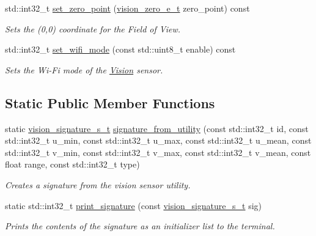 \begin{DoxyCompactItemize}
std\+::int32\+\_\+t \mbox{\hyperlink{classpros_1_1Vision_a89e0a23b112b8632171ef27cc6f57a6c}{set\+\_\+zero\+\_\+point}} (\mbox{\hyperlink{vision_8h_a2e8bc1c48f8aab12275bfc1868fbbad6}{vision\+\_\+zero\+\_\+e\+\_\+t}} zero\+\_\+point) const
\begin{DoxyCompactList}\small\item\em Sets the (0,0) coordinate for the Field of View. \end{DoxyCompactList}\item 
std\+::int32\+\_\+t \mbox{\hyperlink{classpros_1_1Vision_aa41af827ad6f9d6c050ca28c51d173ad}{set\+\_\+wifi\+\_\+mode}} (const std\+::uint8\+\_\+t enable) const
\begin{DoxyCompactList}\small\item\em Sets the Wi-\/\+Fi mode of the \mbox{\hyperlink{classpros_1_1Vision}{Vision}} sensor. \end{DoxyCompactList}\end{DoxyCompactItemize}
\subsection*{Static Public Member Functions}
\begin{DoxyCompactItemize}
\item 
static \mbox{\hyperlink{vision_8h_a135c729c7277f6cc019c2924088a5fd5}{vision\+\_\+signature\+\_\+s\+\_\+t}} \mbox{\hyperlink{classpros_1_1Vision_aa46f3bfb4956c7061b34764c92fc68fd}{signature\+\_\+from\+\_\+utility}} (const std\+::int32\+\_\+t id, const std\+::int32\+\_\+t u\+\_\+min, const std\+::int32\+\_\+t u\+\_\+max, const std\+::int32\+\_\+t u\+\_\+mean, const std\+::int32\+\_\+t v\+\_\+min, const std\+::int32\+\_\+t v\+\_\+max, const std\+::int32\+\_\+t v\+\_\+mean, const float range, const std\+::int32\+\_\+t type)
\begin{DoxyCompactList}\small\item\em Creates a signature from the vision sensor utility. \end{DoxyCompactList}\item 
static std\+::int32\+\_\+t \mbox{\hyperlink{classpros_1_1Vision_ada22311366ce088fa9ac08a8e3510800}{print\+\_\+signature}} (const \mbox{\hyperlink{vision_8h_a135c729c7277f6cc019c2924088a5fd5}{vision\+\_\+signature\+\_\+s\+\_\+t}} sig)
\begin{DoxyCompactList}\small\item\em Prints the contents of the signature as an initializer list to the terminal. \end{DoxyCompactList}\end{DoxyCompactItemize}


